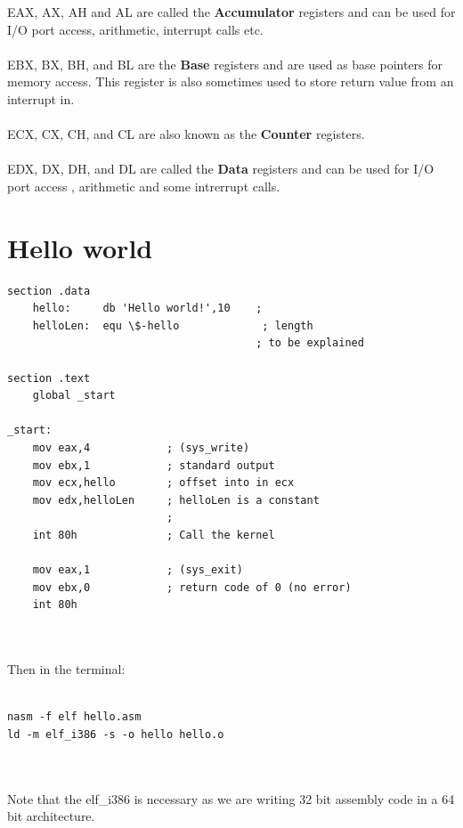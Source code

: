 \documentclass[10pt,a4paper]{book}
\begin{document}
EAX, AX, AH and AL are called the \textbf{Accumulator} registers and can be used for I/O port access, arithmetic, interrupt calls etc.\\\\
EBX, BX, BH, and BL are the \textbf{Base} registers and are used as base pointers for memory access. This register is also sometimes used to store return value from an interrupt in. \\\\
ECX, CX, CH, and CL are also known as the \textbf{Counter} registers. \\\\
EDX, DX, DH, and DL are called the \textbf{Data} registers and can be used for I/O port access , arithmetic and some intrerrupt calls.

\newpage
\section{Hello world}
\begin{verbatim}
section .data
	hello:     db 'Hello world!',10    ; 
	helloLen:  equ \$-hello             ; length 
	                                   ; to be explained

section .text
	global _start

_start:
	mov eax,4            ; (sys_write)
	mov ebx,1            ; standard output
	mov ecx,hello        ; offset into in ecx
	mov edx,helloLen     ; helloLen is a constant
	                     ;  
	int 80h              ; Call the kernel

	mov eax,1            ; (sys_exit)
	mov ebx,0            ; return code of 0 (no error)
	int 80h
\end{verbatim}
\\\\
Then in the terminal:\\\\
\begin{verbatim}
nasm -f elf hello.asm
ld -m elf_i386 -s -o hello hello.o
\end{verbatim}
\\\\
Note that the elf\_i386 is necessary as we are writing 32 bit assembly code in a 64 bit architecture.
\newpage
\end{document}
